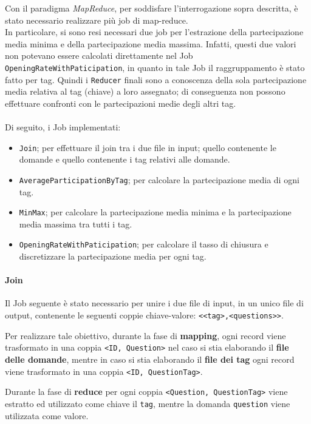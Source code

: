 \documentclass[10pt]{article}
\begin{document}
Con il paradigma \textit{MapReduce}, per soddisfare l'interrogazione sopra descritta, è stato necessario realizzare più job di map-reduce.\\
In particolare, si sono resi necessari due job per l'estrazione della partecipazione media minima e della partecipazione media massima.
Infatti, questi due valori non potevano essere calcolati direttamente nel Job \texttt{OpeningRateWithPaticipation}, in quanto in tale Job il raggruppamento è stato fatto per tag. Quindi i \texttt{Reducer} finali sono a conoscenza della sola partecipazione media relativa al tag (chiave) a loro assegnato; di conseguenza non possono effettuare confronti con le partecipazioni medie degli altri tag.
\\\\
Di seguito, i Job implementati:
\begin{itemize}
    \item \texttt{Join}; per effettuare il join tra i due file in input; quello contenente le domande e quello contenente i tag relativi alle domande.
    \item \texttt{AverageParticipationByTag}; per calcolare la partecipazione media di ogni tag.
    \item \texttt{MinMax}; per calcolare la partecipazione media minima e la partecipazione media massima tra tutti i tag.
    \item \texttt{OpeningRateWithPaticipation}; per calcolare il tasso di chiusura e discretizzare la partecipazione media per ogni tag.
\end{itemize}

\paragraph{Join}
Il Job seguente è stato necessario per unire i due file di input, in un unico file di output, contenente le seguenti coppie chiave-valore: \texttt{<<tag>,<questions>>}.

Per realizzare tale obiettivo, durante la fase di \textbf{mapping}, ogni record viene trasformato in una coppia \texttt{<ID, Question>} nel caso si stia elaborando il \textbf{file delle domande}, mentre in caso si stia elaborando il \textbf{file dei tag} ogni record viene trasformato in una coppia \texttt{<ID, QuestionTag>}.

Durante la fase di \textbf{reduce} per ogni coppia \texttt{<Question, QuestionTag>} viene estratto ed utilizzato come chiave il \texttt{tag}, mentre la domanda \texttt{question} viene utilizzata come valore.
\end{document}
